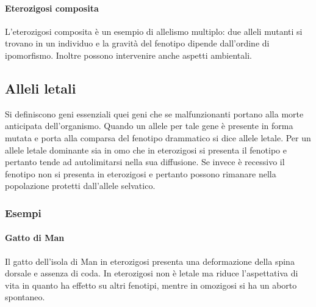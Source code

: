 \paragraph{Eterozigosi composita}
L'eterozigosi composita \`e un esempio di allelismo multiplo: due alleli mutanti si trovano in un individuo e la gravit\`a del fenotipo dipende dall'ordine di ipomorfismo. Inoltre 
possono intervenire anche aspetti ambientali. 
\subsection{Alleli letali}
Si definiscono geni essenziali quei geni che se malfunzionanti portano alla morte anticipata dell'organismo. Quando un allele per tale gene \`e presente in forma mutata e porta
alla comparsa del fenotipo drammatico si dice allele letale. Per un allele letale dominante sia in omo che in eterozigosi si presenta il fenotipo e pertanto tende ad autolimitarsi nella
sua diffusione. Se invece \`e recessivo il fenotipo non si presenta in eterozigosi e pertanto possono rimanare nella popolazione protetti dall'allele selvatico. 
\subsubsection{Esempi}
\paragraph{Gatto di Man}
Il gatto dell'isola di Man in eterozigosi presenta una deformazione della spina dorsale e assenza di coda. In eterozigosi non \`e letale ma riduce l'aspettativa di vita in quanto
ha effetto su altri fenotipi, mentre in omozigosi si ha un aborto spontaneo. 
